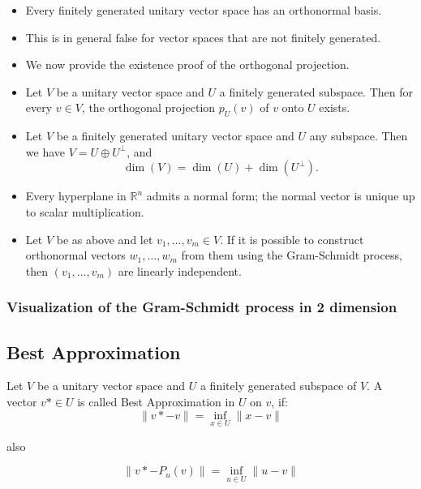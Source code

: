 \begin{itemize}[label=\(-\)]

    \item Every finitely generated unitary vector space has an orthonormal basis.

    \item This is in general false for vector spaces that are not finitely generated.

    \item We now provide the existence proof of the orthogonal projection.

    \item Let \( V \) be a unitary vector space and \( U \) a finitely generated subspace. Then for every \( v \in V \), the orthogonal projection \( p_U(v) \) of \( v \) onto \( U \) exists.
    
    \item Let \( V \) be a finitely generated unitary vector space and \( U \) any subspace. Then we have \( V = U \oplus U^\perp \), and
    \[
    \dim(V) = \dim(U) + \dim(U^\perp).
    \]
    
    \item Every hyperplane in \( \mathbb{R}^n \) admits a normal form; the normal vector is unique up to scalar multiplication.
    
    \item Let \( V \) be as above and let \( v_1, \ldots, v_m \in V \). If it is possible to construct orthonormal vectors \( w_1, \ldots, w_m \) from them using the Gram-Schmidt process, then \( (v_1, \ldots, v_m) \) are linearly independent.
    
\end{itemize}


\subsubsection{Visualization of the Gram-Schmidt process in 2 dimension}

\begin{center}
\end{center}

\subsection{Best Approximation}

Let \(V\) be a unitary vector space and \(U\) a finitely generated subspace of \(V\).
A vector \(v* \in U\) is called Best Approximation in \(U\) on \(v\), if:
\[
\|v* - v\| = \inf_{x \in U}\|x - v\|
\]

 also

\[
\|v* - P_u(v)\| = \inf_{u \in U}\|u - v\|
\]


